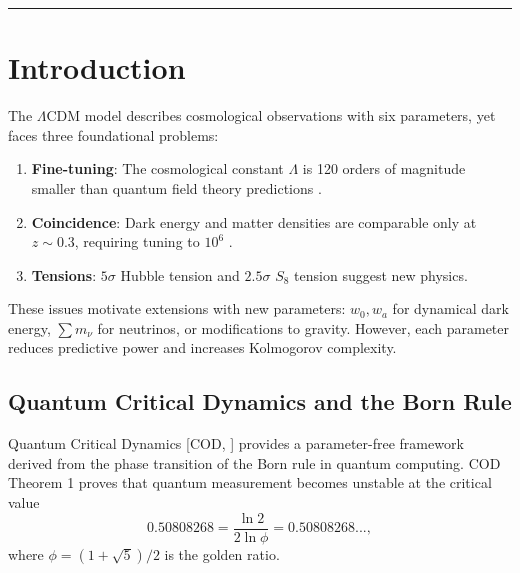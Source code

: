 \documentclass[12pt, a4paper]{article}
\theoremstyle{miuThm}
\theoremstyle{remark}
\newcommand{\qcrit}{0.50808268}
\begin{document}
\bigskip
\noindent\rule{0.85\linewidth}{0.4pt}
\bigskip
\tableofcontents
\newpage
\section{Introduction}
\label{sec:intro}

The $\Lambda$CDM model describes cosmological observations with six parameters, 
yet faces three foundational problems:

\begin{enumerate}
\item \textbf{Fine-tuning}: The cosmological constant $\Lambda$ is 120 orders of 
      magnitude smaller than quantum field theory predictions \cite{Weinberg1989}.
\item \textbf{Coincidence}: Dark energy and matter densities are comparable 
      only at $z \sim 0.3$, requiring tuning to $10^6$ \cite{Zlatev1999}.
\item \textbf{Tensions}: $5\sigma$ Hubble tension \cite{Riess2022} and 
      $2.5\sigma$ $S_8$ tension \cite{Heymans2021} suggest new physics.
\end{enumerate}

These issues motivate extensions with new parameters: $w_0, w_a$ for dynamical 
dark energy, $\sum m_\nu$ for neutrinos, or modifications to gravity. However, 
each parameter reduces predictive power and increases Kolmogorov complexity.

\subsection{Quantum Critical Dynamics and the Born Rule}

Quantum Critical Dynamics [COD, \cite{Alcántara2024}] provides a parameter-free 
framework derived from the phase transition of the Born rule in quantum computing. 
COD Theorem 1 proves that quantum measurement becomes unstable at the critical 
value
\begin{equation}
\qcrit = \frac{\ln 2}{2\ln\phi} = 0.50808268..., \label{eq:qcrit}
\end{equation}
where $\phi = (1+\sqrt{5})/2$ is the golden ratio. 
\end{document}
